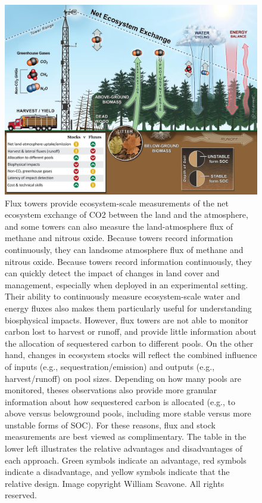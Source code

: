 \documentclass[
  letterpaper,
  DIV=11,
  numbers=noendperiod]{scrreprt}
\begin{document}
\begin{figure}

{\centering \includegraphics{img/03-ecosystem-fluxes-stocks.jpg}

}

\caption{\label{fig-key-fluxes-stocks}Flux towers provide
ecosystem-scale measurements of the net ecosystem exchange of CO2
between the land and the atmosphere, and some towers can also measure
the land-atmosphere flux of methane and nitrous oxide. Because towers
record information continuously, they can landsome atmosphere flux of
methane and nitrous oxide. Because towers record information
continuously, they can quickly detect the impact of changes in land
cover and management, especially when deployed in an experimental
setting. Their ability to continuously measure ecosystem-scale water and
energy fluxes also makes them particularly useful for understanding
biosphysical impacts. However, flux towers are not able to monitor
carbon lost to harvest or runoff, and provide little information about
the allocation of sequestered carbon to different pools. On the other
hand, changes in ecosystem stocks will reflect the combined influence of
inputs (e.g., sequestration/emission) and outputs (e.g., harvest/runoff)
on pool sizes. Depending on how many pools are monitored, theses
observations also provide more granular information about how
sequestered carbon is allocated (e.g., to above versus belowground
pools, including more stable versus more unstable forms of SOC). For
these reasons, flux and stock measurements are best viewed as
complimentary. The table in the lower left illustrates the relative
advantages and disadvantages of each approach. Green symbols indicate an
advantage, red symbols indicate a disadvantage, and yellow symbols
indicate that the relative design. Image copyright William Scavone. All
rights reserved.}

\end{figure}
\end{document}
